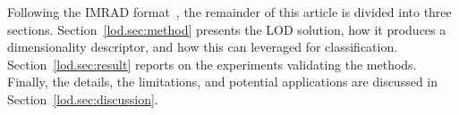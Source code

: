 		Following the IMRAD format~\citep{Wu2011}, the remainder of this article is divided into three sections.
		Section~\ref{lod.sec:method} presents the LOD solution, how it produces a dimensionality descriptor, and how this can leveraged for classification.  
		Section~\ref{lod.sec:result} reports on the experiments validating the methods.
		Finally, the details, the limitations, and potential applications are discussed in Section~\ref{lod.sec:discussion}.
		
